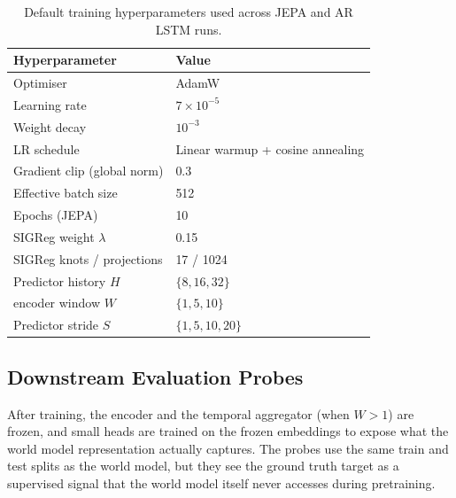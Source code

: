 \begin{table}[h]
  \centering
  \caption{Default training hyperparameters used across JEPA and
  AR LSTM runs.}
  \label{tab:training}
  \begin{tabular}{ll}
    \toprule
    Hyperparameter & Value \\
    \midrule
    Optimiser                     & AdamW \\
    Learning rate                 & $7\!\times\!10^{-5}$ \\
    Weight decay                  & $10^{-3}$ \\
    LR schedule                   & Linear warmup + cosine annealing \\
    Gradient clip (global norm)   & 0.3 \\
    Effective batch size          & 512 \\
    Epochs (JEPA)                 & 10 \\
    SIGReg weight $\lambda$       & 0.15 \\
    SIGReg knots / projections    & 17 / 1024 \\
    Predictor history $H$         & $\{8, 16, 32\}$ \\
    encoder window $W$            & $\{1, 5, 10\}$ \\
    Predictor stride $S$          & $\{1, 5, 10, 20\}$ \\
    \bottomrule
  \end{tabular}
\end{table}

\subsection{Downstream Evaluation Probes}
\label{app:probes}

After training, the encoder and the temporal aggregator (when $W > 1$)
are frozen, and small heads are trained on the frozen embeddings to
expose what the world model representation actually captures. The
probes use the same train and test splits as the world model, but they
see the ground truth target as a supervised signal that the world model
itself never accesses during pretraining.

